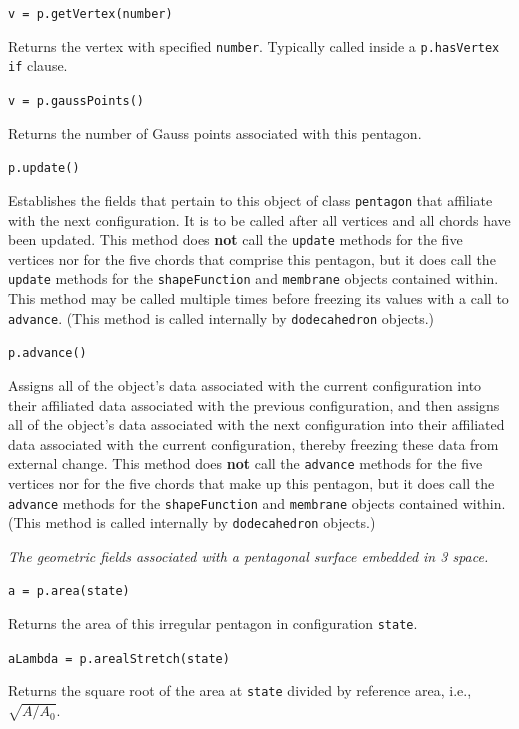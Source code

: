 \medskip\noindent
\texttt{v = p.getVertex(number)}

\medskip\noindent
Returns the vertex with specified \texttt{number}.  Typically called inside a \texttt{p.hasVertex if} clause.

\newpage
\medskip\noindent
\texttt{v = p.gaussPoints()}

\medskip\noindent
Returns the number of Gauss points associated with this pentagon.

\medskip\noindent
\texttt{p.update()}

\medskip\noindent
Establishes the fields that pertain to this object of class \texttt{pentagon} that affiliate with the next configuration.  It is to be called after all vertices and all chords have been updated.  This method does \textbf{not} call the \texttt{update} methods for the five vertices nor for the five chords that comprise this pentagon, but it does call the \texttt{update} methods for the \texttt{shapeFunction} and \texttt{membrane} objects contained within.  This method may be called multiple times before freezing its values with a call to \texttt{advance}.  (This method is called internally by \texttt{dodecahedron} objects.)

\medskip\noindent
\texttt{p.advance()}

\medskip\noindent
Assigns all of the object's data associated with the current configuration into their affiliated data associated with the previous configuration, and then assigns all of the object's data associated with the next configuration into their affiliated data associated with the current configuration, thereby freezing these data from external change.  This method does \textbf{not} call the \texttt{advance} methods for the five vertices nor for the five chords that make up this pentagon, but it does call the \texttt{advance} methods for the \texttt{shapeFunction} and \texttt{membrane} objects contained within.  (This method is called internally by \texttt{dodecahedron} objects.)

\medskip\noindent
\textit{The geometric fields associated with a pentagonal surface embedded in 3 space.}

\medskip\noindent
\texttt{a = p.area(state)}

\medskip\noindent
Returns the area of this irregular pentagon in configuration \texttt{state}.

\medskip\noindent
\texttt{aLambda = p.arealStretch(state)}

\medskip\noindent
Returns the square root of the area at \texttt{state} divided by reference area, i.e., $\sqrt{A / A_0}$.

